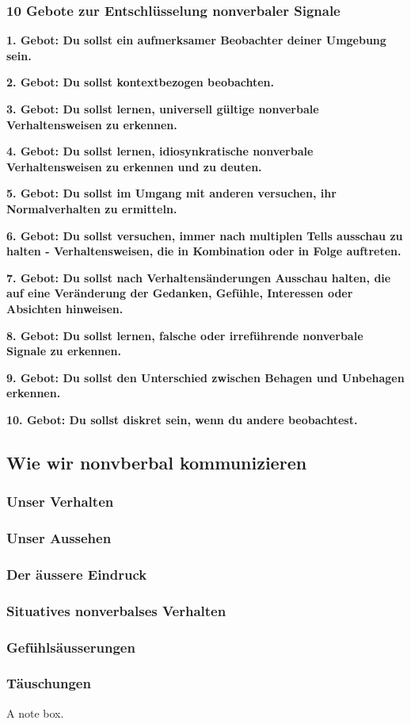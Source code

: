 \documentclass[
    invert-title=false,
    titlepage=true,
    titleimage-ratio=1011,
    parskip=half-,
]{bfhpub}                %
\begin{document}
    \subsubsection{10 Gebote zur Entschlüsselung nonverbaler Signale}
    \hskip 12pt\relax\textbf{1. Gebot: Du sollst ein aufmerksamer Beobachter deiner Umgebung sein.}
    \par\textbf{2. Gebot: Du sollst kontextbezogen beobachten.}
    \par\textbf{3. Gebot: Du sollst lernen, universell gültige nonverbale Verhaltensweisen zu erkennen.}
    \par\textbf{4. Gebot: Du sollst lernen, idiosynkratische nonverbale Verhaltensweisen zu erkennen und zu deuten.}
    \par\textbf{5. Gebot: Du sollst im Umgang mit anderen versuchen, ihr Normalverhalten zu ermitteln.}
    \par\textbf{6. Gebot: Du sollst versuchen, immer nach multiplen Tells ausschau zu halten - Verhaltensweisen, die in Kombination oder in Folge auftreten.}
    \par\textbf{7. Gebot: Du sollst nach Verhaltensänderungen Ausschau halten, die auf eine Veränderung der Gedanken, Gefühle, Interessen oder Absichten hinweisen.}
    \par\textbf{8. Gebot: Du sollst lernen, falsche oder irreführende nonverbale Signale zu erkennen.}
    \par\textbf{9. Gebot: Du sollst den Unterschied zwischen Behagen und Unbehagen erkennen.}
    \par\textbf{10. Gebot: Du sollst diskret sein, wenn du andere beobachtest.}

    \subsection{Wie wir nonvberbal kommunizieren}

    \subsubsection{Unser Verhalten}

    \subsubsection{Unser Aussehen}

    \subsubsection{Der äussere Eindruck}

    \subsubsection{Situatives nonverbalses Verhalten}

    \subsubsection{Gefühlsäusserungen}

    \subsubsection{Täuschungen}


    \begin{bfhNoteBox}
        A note box.
    \end{bfhNoteBox}

    \printbibliography
\end{document}
